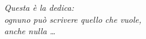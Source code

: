 \begin{titlepage}
  \thispagestyle{empty}

  \topmargin=6.5cm %

  \begin{flushright}
    \large %
    \em %
    Questa è la dedica: \\
    ognuno può scrivere quello che vuole, \\
    anche nulla \ldots
  \end{flushright}
\end{titlepage}
